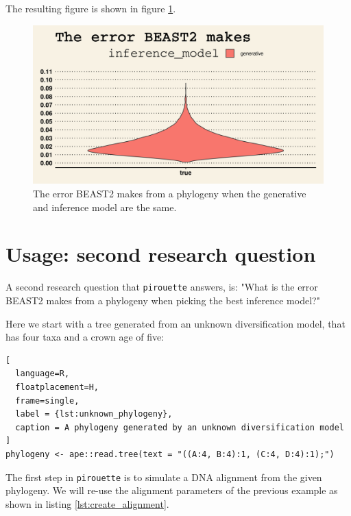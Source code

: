 \documentclass{article}
\begin{document}
The resulting figure is shown in figure \ref{fig:example_1}.

\begin{figure}[h]
  \includegraphics[width=\textwidth]{figure_example_1.png}
  \caption{
    The error BEAST2 makes from a phylogeny 
    when the generative and inference model are the same.
  }
  \label{fig:example_1}
\end{figure}

\section{Usage: second research question}

A second research question that \verb;pirouette; answers, is:
"What is the error BEAST2 makes from a phylogeny when
picking the best inference model?"

Here we start with a tree generated from an unknown 
diversification model, that has four taxa and a crown age of five:

\begin{lstlisting}[
  language=R, 
  floatplacement=H, 
  frame=single, 
  label = {lst:unknown_phylogeny},
  caption = A phylogeny generated by an unknown diversification model
]
phylogeny <- ape::read.tree(text = "((A:4, B:4):1, (C:4, D:4):1);")
\end{lstlisting}

The first step in \verb;pirouette; is to simulate a DNA alignment from the given phylogeny. We will re-use the alignment parameters of the previous example as shown in listing \ref{lst:create_alignment}.
\end{document}
